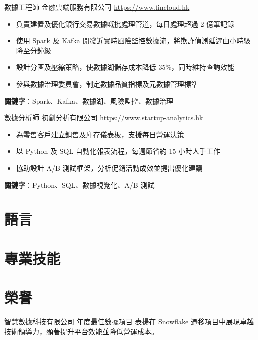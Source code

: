 \documentclass[a4paper, serif, 10pt]{moderncv}
\begin{document}
        {數據工程師}
        {金融雲端服務有限公司}
        {\url{https://www.fincloud.hk}}
        {}
        {\begin{itemize}
\item 負責建置及優化銀行交易數據嘅批處理管道，每日處理超過 2 億筆記錄
\item 使用 Spark 及 Kafka 開發近實時風險監控數據流，將欺詐偵測延遲由小時級降至分鐘級
\item 設計分區及壓縮策略，使數據湖儲存成本降低 35\%，同時維持查詢效能
\item 參與數據治理委員會，制定數據品質指標及元數據管理標準
\end{itemize}
\textbf{關鍵字}：Spark、Kafka、數據湖、風險監控、數據治理}

        {數據分析師}
        {初創分析有限公司}
        {\url{https://www.startup-analytics.hk}}
        {}
        {\begin{itemize}
\item 為零售客戶建立銷售及庫存儀表板，支援每日營運決策
\item 以 Python 及 SQL 自動化報表流程，每週節省約 15 小時人手工作
\item 協助設計 A/B 測試框架，分析促銷活動成效並提出優化建議
\end{itemize}
\textbf{關鍵字}：Python、SQL、數據視覺化、A/B 測試}
\section{語言}

\section{專業技能}

\section{榮譽}

        {智慧數據科技有限公司}
        {年度最佳數據項目}
        {}
        {}
        {表揚在 Snowflake 遷移項目中展現卓越技術領導力，顯著提升平台效能並降低營運成本。}
\end{document}

